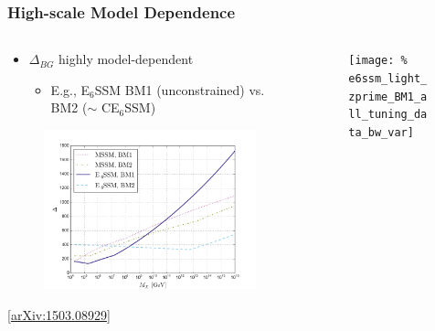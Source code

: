 \documentclass[10pt,aspectratio=169]{beamer}
\begin{document}
\begin{frame}
  \frametitle{High-scale Model Dependence}
  \begin{columns}
    \begin{column}{0.5\textwidth}
      \begin{itemize}
        \item $\Delta_{BG}$ highly model-dependent
          \begin{itemize}
            \item E.g., E$_6$SSM BM1 (unconstrained) vs. BM2 ($\sim$
              CE$_6$SSM)
          \end{itemize}
      \end{itemize}
      \vspace*{-15pt}
      \begin{figure}
        \begin{center}
          \includegraphics[width=\textwidth]
            {e6ssm_mssm_benchmark_points_tuning_vs_cutoff_bw_var}
        \end{center}
      \end{figure}
      \begin{center}
        \tiny [\href{https://arxiv.org/abs/1503.08929}{arXiv:1503.08929}]
      \end{center}
    \end{column}
    \begin{column}{0.5\textwidth}
      \vspace*{-20pt}
      \begin{figure}
        \begin{center}
          \texttt{[image: \%
          e6ssm\_light\_zprime\_BM1\_all\_tuning\_data\_bw\_var]}

\end{center}
\end{figure}
\end{column}
\end{columns}
\end{frame}
\end{document}
